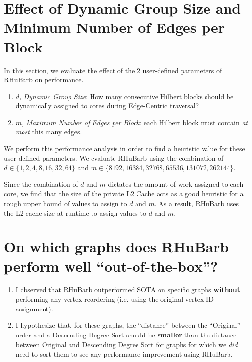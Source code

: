 \section{Effect of Dynamic Group Size and Minimum Number of Edges per Block}\label{sec:hparams}

In this section, we evaluate the effect of the 2 user-defined parameters of RHuBarb on  performance.

\begin{enumerate}
    \item \textit{$d$, Dynamic Group Size}: How many consecutive Hilbert blocks should be dynamically assigned to cores during Edge-Centric traversal?
    \item \textit{$m$, Maximum Number of Edges per Block}: each Hilbert block must contain \textit{at most} this many edges. 
\end{enumerate}

We perform this performance analysis in order to find a heuristic value for these user-defined parameters.
We evaluate RHuBarb using the combination of $d\in\{1, 2, 4, 8, 16, 32, 64\}$ and 
$m\in\{
    \num[group-separator={,}]{8192}, 
    \num[group-separator={,}]{16384}, 
    \num[group-separator={,}]{32768}, 
    \num[group-separator={,}]{65536}, 
    \num[group-separator={,}]{131072}, 
    \num[group-separator={,}]{262144}
\}$.

Since the combination of $d$ and $m$ dictates the amount of work assigned to each core, we find that the size of the private L2 Cache acts as a good heuristic for a rough upper bound of values to assign to $d$ and $m$. As a result, RHuBarb uses the L2 cache-size at runtime to assign values to $d$ and $m$.

\section{On which graphs does RHuBarb perform well ``out-of-the-box''?}\label{sec:rank-compare}

          \begin{enumerate}
            \item I observed that RHuBarb outperformed SOTA on specific graphs \textbf{without} performing any vertex reordering (i.e. using the original vertex ID assignment). 
            \item I hypothesize that, for these graphs, the ``distance'' between the ``Original'' order and a Descending Degree Sort should be \textbf{smaller} than the distance between Original and Descending Degree Sort for graphs for which we \textit{did} need to sort them to see any performance improvement using RHuBarb.
          \end{enumerate}

